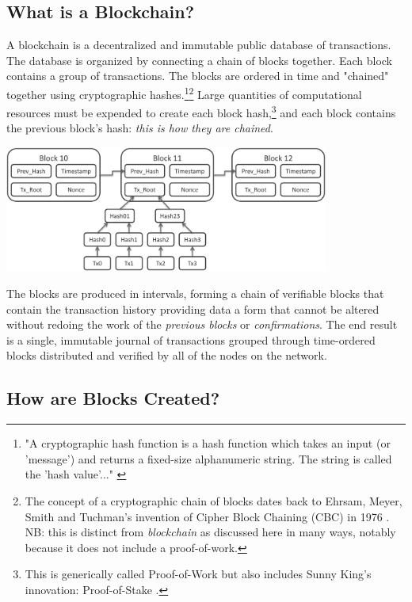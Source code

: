 \documentclass[11pt]{article}
\begin{document}
\subsection{What is a Blockchain?}

A blockchain is a decentralized and immutable public database of transactions. 
The database is organized by connecting a chain of blocks together.
Each block contains a group of transactions.
The blocks are ordered in time and "chained" together using cryptographic hashes.\footnote{"A cryptographic hash function is a hash function which takes an input (or 'message') and returns a fixed-size alphanumeric string. The string is called the 'hash value'..." \cite{wikihash}}\footnote{The concept of a cryptographic chain of blocks dates back to Ehrsam, Meyer, Smith and Tuchman's invention of Cipher Block Chaining (CBC) in 1976 \cite{cbc}. NB: this is distinct from \textit{blockchain} as discussed here in many ways, notably because it does not include a proof-of-work.}
Large quantities of computational resources must be expended to create each block hash,\footnote{This is generically called Proof-of-Work but also includes Sunny King's innovation: Proof-of-Stake \cite{peercoin}.} and each block contains the previous block's hash: \textit{this is how they are chained}.

\begin{center}
\includegraphics[width=0.80\textwidth]{./blockchain.png}
\end{center}
The blocks are produced in intervals, forming a chain of verifiable blocks that contain the transaction history providing data a form that cannot be altered without redoing the work of the \textit{previous blocks} or \textit{confirmations}.
The end result is a single, immutable journal of transactions grouped through time-ordered blocks distributed and verified by all of the nodes on the network.


\subsection{How are Blocks Created?}
\end{document}
